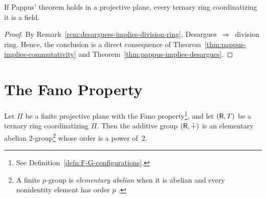 \begin{cor}\label{cor:pappus-implies-field}
    If Pappus' theorem holds in a projective plane, every ternary ring coordinatizing it is a field.
\end{cor}

\begin{proof}
    By Remark~\ref{rem:desarguess-implies-division-ring},
    Desargues~$\Rightarrow$~division ring. Hence, the conclusion is a direct consequence of Theorem~\ref{thm:pappus-implies-commutativity} and Theorem~\ref{thm:pappus-implies-desargues}.
    
\end{proof}

\section{The Fano Property}

\begin{thm}\label{thm:elementary-abelian-2-group}
    Let\/ $\Pi$ be a finite projective plane with the Fano property\>\footnote{See Definition~\ref{defn:F-G-configurations}.}, and let\/ $(\mathsf R,T)$ be a ternary ring coordinatizing\/ $\Pi$. Then the additive group\/ $(\mathsf R,\dotplus)$ is an elementary abelian\/ $2$-group\>\footnote{A finite $p$-group is \textsl{elementary abelian} when it is abelian and every nonidentity element has order $p$ \citep{LC-Groups}.} whose order is a power of\/~$2$.
\end{thm}

